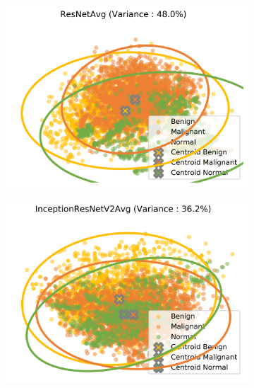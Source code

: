 \begin{figure}[H]
\begin{subfigure}{.2\textwidth}
      \includegraphics[width=\textwidth]{contents/chapter_4/resources/visualisation_transfer_ResNetAvg.png}
    \end{subfigure}
    \begin{subfigure}{.2\textwidth}
      \includegraphics[width=\textwidth]{contents/chapter_4/resources/visualisation_transfer_InceptionResNetV2Avg.png}
    \end{subfigure}
    

\end{figure}
